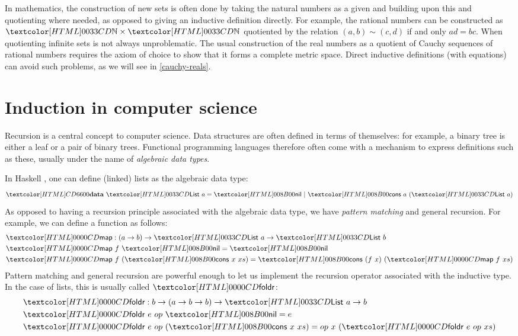 In mathematics, the construction of new sets is often done by taking
the natural numbers as a given and building upon this and quotienting
where needed, as opposed to giving an inductive definition
directly. For example, the rational numbers can be constructed as
$\natty \times \natty$ quotiented by the relation
$(a , b) \sim (c , d)$ if and only $ad = bc$. When quotienting
infinite sets is not always unproblematic. The usual construction of
the real numbers as a quotient of Cauchy sequences of rational numbers
requires the axiom of choice to show that it forms a complete metric
space. Direct inductive definitions (with equations) can avoid such
problems, as we will see in \cref{cauchy-reals}.

\section{Induction in computer science}

Recursion is a central concept to computer science. Data structures
are often defined in terms of themselves: for example, a binary tree
is either a leaf or a pair of binary trees. Functional programming
languages therefore often come with a mechanism to express definitions
such as these, usually under the name of \emph{algebraic data types}.

In Haskell \cite{Jones2003}, one can define (linked) lists as the
algebraic data type:
$$
\data\ \List\ a = \listnil\ |\ \listcons\ a\ (\List\ a)
$$
As opposed to having a recursion principle associated with the
algebraic data type, we have \emph{pattern matching} and general
recursion. For example, we can define a function as follows:
%
\begin{align*}
  &\listmap : (a \to b) \to \List\ a \to \List\ b \\
  &\listmap\ f\ \listnil = \listnil \\
  &\listmap\ f\ (\listcons\ x\ xs) = \listcons\ (f\ x)\ (\listmap\ f\ xs)
\end{align*}
%
Pattern matching and general recursion are powerful enough to let us
implement the recursion operator associated with the inductive
type. In the case of lists, this is usually called $\listfoldr$:
%
\begin{align*}
  &\listfoldr : b \to (a \to b \to b) \to \List\ a \to b \\
  &\listfoldr\ e\ op\ \listnil = e \\
  &\listfoldr\ e\ op\ (\listcons\ x\ xs) = op\ x\ (\listfoldr\ e\ op\ xs)
\end{align*}
%

